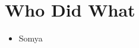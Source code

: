 \documentclass[./Report_main.tex]{subfiles}
\begin{document}
\section{Who Did What}
\begin{itemize}
    \item Somya
\end{itemize}
\end{document}
